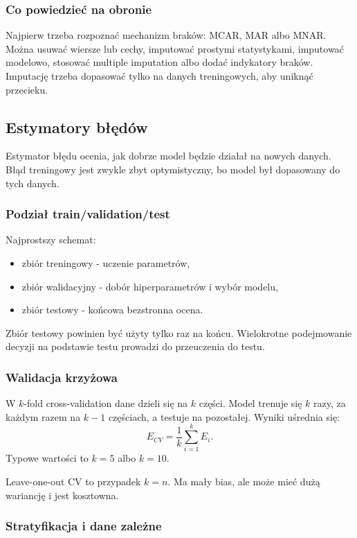 \subsubsection{Co powiedzieć na obronie}

Najpierw trzeba rozpoznać mechanizm braków: MCAR, MAR albo MNAR. Można usuwać wiersze lub cechy, imputować prostymi statystykami, imputować modelowo, stosować multiple imputation albo dodać indykatory braków. Imputację trzeba dopasować tylko na danych treningowych, aby uniknąć przecieku.

\subsection{Estymatory błędów}

Estymator błędu ocenia, jak dobrze model będzie działał na nowych danych. Błąd treningowy jest zwykle zbyt optymistyczny, bo model był dopasowany do tych danych.

\subsubsection{Podział train/validation/test}

Najprostszy schemat:
\begin{itemize}
  \item zbiór treningowy - uczenie parametrów,
  \item zbiór walidacyjny - dobór hiperparametrów i wybór modelu,
  \item zbiór testowy - końcowa bezstronna ocena.
\end{itemize}

Zbiór testowy powinien być użyty tylko raz na końcu. Wielokrotne podejmowanie decyzji na podstawie testu prowadzi do przeuczenia do testu.

\subsubsection{Walidacja krzyżowa}

W $k$-fold cross-validation dane dzieli się na $k$ części. Model trenuje się $k$ razy, za każdym razem na $k-1$ częściach, a testuje na pozostałej. Wyniki uśrednia się:
\[
\hat E_{CV}=\frac{1}{k}\sum_{i=1}^{k}E_i.
\]
Typowe wartości to $k=5$ albo $k=10$.

Leave-one-out CV to przypadek $k=n$. Ma mały bias, ale może mieć dużą wariancję i jest kosztowna.

\subsubsection{Stratyfikacja i dane zależne}

